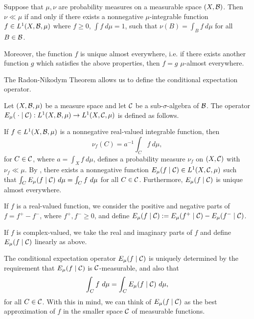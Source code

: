 \begin{theorem} \label{thm:radon-nikodym}
	Suppose that $\mu, \nu$ are probability measures on a measurable space $(X, \mathcal{B})$. Then $\nu \ll \mu$ if and only if there exists a nonnegative $\mu$-integrable function $f \in L^1(X, \mathcal{B}, \mu)$ where $f \geq 0$, $\int{f\ d\mu} = 1$, such that $\nu(B) = \int_B{f\ d\mu}$ for all $B \in \mathcal{B}$.
	
	Moreover, the function $f$ is unique almost everywhere, i.e. if there exists another function $g$ which satisfies the above properties, then $f = g$ $\mu$-almost everywhere.
\end{theorem}

The Radon-Nikodym Theorem allows us to define the conditional expectation operator.

\begin{definition}
	Let $(X, \mathcal{B}, \mu)$ be a measure space and let $\mathcal{C}$ be a sub-$\sigma$-algebra of $\mathcal{B}$. The  operator $E_\mu(\mathrel{}\cdot\mathrel{} \mid \mathcal{C}) : L^1(X, \mathcal{B}, \mu) \to L^1(X, \mathcal{C}, \mu)$ is defined as follows.
	
	If $f \in L^1(X, \mathcal{B}, \mu)$ is a nonnegative real-valued integrable function, then
	\[
		\nu_f(C) = a^{-1}\int_C{f\ d\mu},
	\]
	for $C \in \mathcal{C}$, where $a = \int_X{f\ d\mu}$, defines a probability measure $\nu_f$ on $(X, \mathcal{C})$ with $\nu_f \ll \mu$. By , there exists a nonnegative function $E_\mu(f \mid \mathcal{C}) \in L^1(X, \mathcal{C}, \mu)$ such that $\int_C{E_\mu(f \mid \mathcal{C})\ d\mu} = \int_C{f\ d\mu}$ for all $C \in \mathcal{C}$. Furthermore, $E_\mu(f \mid \mathcal{C})$ is unique almost everywhere.
	
	If $f$ is a real-valued function, we consider the positive and negative parts of $f = f^+ - f^-$, where $f^+, f^- \geq 0$, and define $E_\mu(f \mid \mathcal{C}) := E_\mu(f^+ \mid \mathcal{C}) - E_\mu(f^- \mid \mathcal{C})$.
	
	If $f$ is complex-valued, we take the real and imaginary parts of $f$ and define $E_\mu(f \mid \mathcal{C})$ linearly as above.
\end{definition}

The conditional expectation operator $E_\mu(f \mid \mathcal{C})$ is uniquely determined by the requirement that $E_\mu(f \mid \mathcal{C})$ is $\mathcal{C}$-measurable, and also that
\[
	\int_C{f\ d\mu} = \int_C{E_\mu(f \mid \C)\ d\mu},
\]
for all $C \in \mathcal{C}$. With this in mind, we can think of $E_\mu(f \mid \mathcal{C})$ as the best approximation of $f$ in the smaller space $\mathcal{C}$ of measurable functions.~\cite[Lecture 21]{ergodic-lectures}

